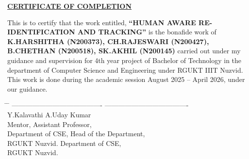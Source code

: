 \documentclass{report}
\begin{document}
\vspace{30pt} %

\begin{center}
    \textbf{\Large \underline{CERTIFICATE OF COMPLETION}}\\[30pt]
\end{center}

\noindent
\normalsize{This is to certify that the work entitled, \textbf{``HUMAN AWARE RE-IDENTIFICATION AND TRACKING''} is the bonafide work of \textbf{K.HARSHITHA (N200373), CH.RAJESWARI (N200427),\vspace{3pt} B.CHETHAN (N200518), SK.AKHIL (N200145)} carried out under my guid\vspace{3pt}ance and supervision for 4th year project of Bachelor of Technology in the department of Computer\vspace{3pt} Science and Engineering under RGUKT IIIT Nuzvid. This work is done during the academic session\vspace{3pt} August 2025 -- April 2026, under our guidance.}\\[60pt]

\begin{tabbing}
    \hspace{3in} \= \hspace{1.5in} \= \kill
    ---------------------------------------- \> \> ------------------------------------- \\
    Y.Kalavathi\> \> A.Uday Kumar  \\
    Mentor, \> \> Assistant Professor, \\
    Department of CSE, \> \> Head of the Department, \\
    RGUKT Nuzvid. \> \> Department of CSE, \\
    \> \> RGUKT Nuzvid.
\end{tabbing}

\newpage

\setlength{\parindent}{0pt}
\setlength{\parskip}{1em}
\end{document}

